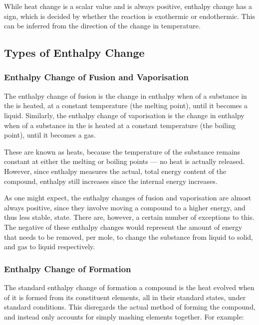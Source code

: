 			While heat change is a scalar value and is always positive, enthalpy change has a sign, which is decided by whether the reaction is
			exothermic or endothermic. This can be inferred from the direction of the change in temperature.


		\subsection{Types of Enthalpy Change}

			\subsubsection{Enthalpy Change of Fusion and Vaporisation}

				The enthalpy change of fusion is the change in enthalpy when  of a substance in the  is heated,
				at a constant temperature (the melting point), until it becomes a liquid. Similarly, the enthalpy change of vaporisation is the
				change in enthalpy when  of a substance in the  is heated at a constant temperature
				(the boiling point), until it becomes a gas.

				These are known as  heats, because the temperature of the substance remains constant at either the melting or
				boiling points — no heat is actually released. However, since enthalpy measures the actual, total energy content of the compound,
				enthalpy still increases since the internal energy increases.

				As one might expect, the enthalpy changes of fusion and vaporisation are almost always positive, since they involve moving a
				compound to a higher energy, and thus less stable, state. There are, however, a certain number of exceptions to this.
				The negative of these enthalpy changes would represent the amount of energy that needs to be removed, per mole, to change the
				substance from liquid to solid, and gas to liquid respectively.



			\pagebreak
			\subsubsection{Enthalpy Change of Formation}

				The standard enthalpy change of formation a compound is the heat evolved when  of it is formed from its constituent
				elements, all in their standard states, under standard conditions. This disregards the actual method of forming the compound, and
				instead only accounts for simply mashing elements together. For example:

